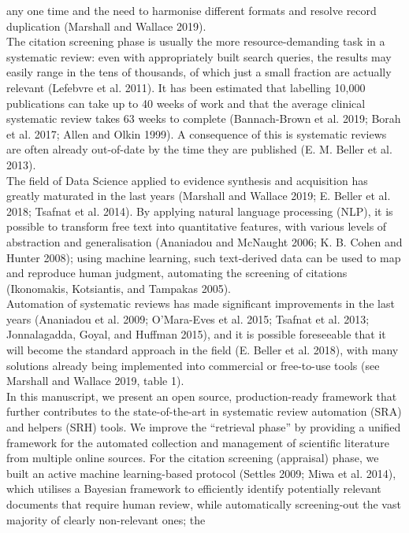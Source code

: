 \documentclass{article}
\begin{document}
any one time and the need to harmonise different formats and resolve
record duplication (Marshall and Wallace 2019).\\
The citation screening phase is usually the more resource-demanding task
in a systematic review: even with appropriately built search queries,
the results may easily range in the tens of thousands, of which just a
small fraction are actually relevant (Lefebvre et al. 2011). It has been
estimated that labelling 10,000 publications can take up to 40 weeks of
work and that the average clinical systematic review takes 63 weeks to
complete (Bannach-Brown et al. 2019; Borah et al. 2017; Allen and Olkin
1999). A consequence of this is systematic reviews are often already
out-of-date by the time they are published (E. M. Beller et al. 2013).\\
The field of Data Science applied to evidence synthesis and acquisition
has greatly maturated in the last years (Marshall and Wallace 2019; E.
Beller et al. 2018; Tsafnat et al. 2014). By applying natural language
processing (NLP), it is possible to transform free text into
quantitative features, with various levels of abstraction and
generalisation (Ananiadou and McNaught 2006; K. B. Cohen and Hunter
2008); using machine learning, such text-derived data can be used to map
and reproduce human judgment, automating the screening of citations
(Ikonomakis, Kotsiantis, and Tampakas 2005).\\
Automation of systematic reviews has made significant improvements in
the last years (Ananiadou et al. 2009; O'Mara-Eves et al. 2015; Tsafnat
et al. 2013; Jonnalagadda, Goyal, and Huffman 2015), and it is possible
foreseeable that it will become the standard approach in the field (E.
Beller et al. 2018), with many solutions already being implemented into
commercial or free-to-use tools (see Marshall and Wallace 2019, table
1).\\
In this manuscript, we present an open source, production-ready
framework that further contributes to the state-of-the-art in systematic
review automation (SRA) and helpers (SRH) tools. We improve the
``retrieval phase'' by providing a unified framework for the automated
collection and management of scientific literature from multiple online
sources. For the citation screening (appraisal) phase, we built an
active machine learning-based protocol (Settles 2009; Miwa et al. 2014),
which utilises a Bayesian framework to efficiently identify potentially
relevant documents that require human review, while automatically
screening-out the vast majority of clearly non-relevant ones; the
\end{document}
